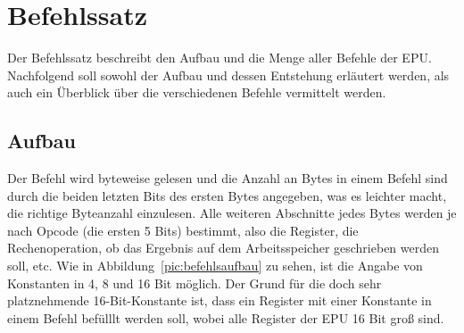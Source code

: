 \section{Befehlssatz}
\label{s:befehlsstz}
Der Befehlssatz beschreibt den Aufbau und die Menge aller Befehle der \ac{EPU}.
Nachfolgend soll sowohl der Aufbau und dessen Entstehung erläutert werden, als
auch ein Überblick über die verschiedenen Befehle vermittelt werden.

\subsection{Aufbau}
Der Befehl wird byteweise gelesen und die Anzahl an Bytes in einem Befehl sind
durch die beiden letzten Bits des ersten Bytes angegeben, was es leichter macht,
die richtige Byteanzahl einzulesen. Alle weiteren Abschnitte jedes Bytes werden
je nach Opcode (die ersten 5 Bits) bestimmt, also die Register, die
Rechenoperation, ob das Ergebnis auf dem Arbeitsspeicher geschrieben werden
soll, etc. Wie in Abbildung~\ref{pic:befehlsaufbau} zu sehen, ist die Angabe
von Konstanten in 4, 8 und 16 Bit möglich. Der Grund für die doch sehr
platznehmende 16-Bit-Konstante ist, dass ein Register mit einer Konstante in
einem Befehl befülllt werden soll, wobei alle Register der \ac{EPU} 16 Bit groß
sind.

